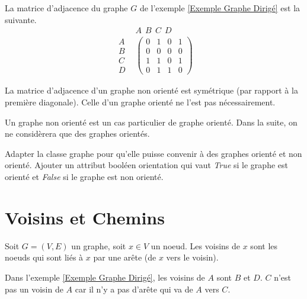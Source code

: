 \documentclass[12pt,fleqn]{article} %
\begin{document}
\begin{example}
	La matrice d'adjacence du graphe $G$ de l'exemple \ref{Exemple Graphe Dirigé} est la suivante.
	\[
	\begin{array}{rc}
		& A\ \ B\ \ C\ \ D \ \ \\
		\begin{array}{c}
			A \\ B \\ C \\D
		\end{array} & \left(\begin{array}{cccc}
			0 & 1 & 0 & 1\\
			0 & 0 & 0 & 0 \\
			1 & 1 & 0 & 1 \\
			0 & 1 & 1 & 0
		\end{array}\right)
	\end{array}
	\]
\end{example}

\begin{proposition}
	La matrice d'adjacence d'un graphe non orienté est symétrique (par rapport à la première diagonale). Celle d'un graphe orienté ne l'est pas nécessairement.
\end{proposition}

\begin{remark}
	Un graphe non orienté est un cas particulier de graphe orienté. Dans la suite, on ne considèrera que des graphes orientés.
\end{remark}

\begin{exercise}
	Adapter la classe graphe pour qu'elle puisse convenir à des graphes orienté et non orienté. Ajouter un attribut booléen orientation qui vaut \textit{True} si le graphe est orienté et \textit{False} si le graphe est non orienté.
\end{exercise}

\section{Voisins et Chemins}

\begin{definition}
	Soit $G = (V,E)$ un graphe, soit $x\in V$ un noeud. Les voisins de $x$ sont les noeuds qui sont liés à $x$ par une arête (de $x$ vers le voisin).
\end{definition}

\begin{example}
	Dans l'exemple \ref{Exemple Graphe Dirigé}, les voisins de $A$ sont $B$ et $D$. $C$ n'est pas un voisin de $A$ car il n'y a pas d'arête qui va de $A$ vers $C$.
\end{example}
\end{document}
